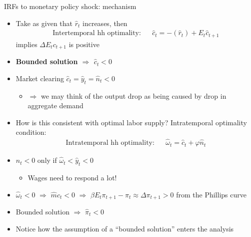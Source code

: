 \documentclass[9pt]{beamer}
\newcommand{\bit}{\begin{itemize}}
\newcommand{\eit}{\end{itemize}}
\newcommand{\bc}{\color{blue}}
\begin{document}
\begin{frame}{IRFs to monetary policy shock: mechanism}

\bit
\setlength\itemsep{1em}
\item Take as given that $\hat r_t$ increases, then
\begin{eqnarray}
\text{Intertemporal hh optimality:} && \hat c_t =  - (\hat r_t) + E_t \hat c_{t+1} \nonumber
\end{eqnarray}
implies $\Delta E_t c_{t+1}$ is positive

\item {\bf Bounded solution $\Rightarrow$ $\hat c_t<0$}

\item Market clearing $\hat c_t = \hat y_t = \hat n_t < 0$
\bit
\item $\Rightarrow$ we may think of the output drop as being caused by drop in {\bc aggregate demand}
\eit

\item How is this consistent with optimal labor supply? Intratemporal optimality condition:
\begin{eqnarray}
\text{Intratemporal hh optimality:} && \hat \omega_t = \hat c_t + \varphi \hat n_t  \nonumber
\end{eqnarray}

\item $\hat n_t<0$ only if $\hat \omega_t < \hat y_t < 0$
\bit
\setlength\itemsep{0.5em}
\item Wages need to respond a lot!
\eit

\item $\hat \omega_t <0$ $\Rightarrow$ $\hat mc_t<0$ $\Rightarrow$ $\beta E_t \pi_{t+1}-\pi_t \approx \Delta \pi_{t+1} >0$ from the Phillips curve

\item Bounded solution $\Rightarrow$ $\hat \pi_t<0$

\item Notice how the assumption of a ``bounded solution'' enters the analysis

\eit


\end{frame}
\end{document}

